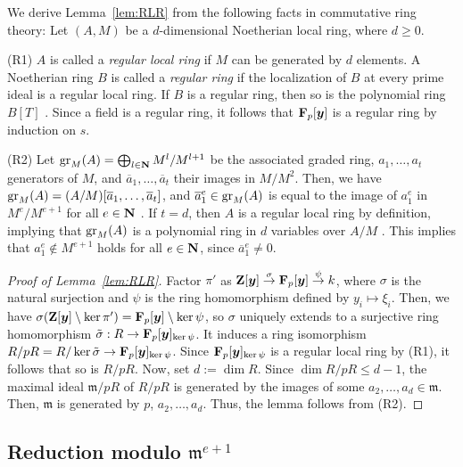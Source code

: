 \documentclass{amsart}
\theoremstyle{plain}
\theoremstyle{definition}
\newcommand{\fm }{{\mathfrak{m}}}
\newcommand{\gr }{\mathop{\rm gr}\nolimits}
\newcommand{\sm}{\setminus}
\newcommand{\nd}{\noindent}
\newcommand{\ol}{\overline}
\newcommand{\F}{{\bf F}}
\newcommand{\Z}{{\bf Z}}
\newcommand{\N}{{\bf N}}
\newcommand{\y}{{\boldsymbol y}}
\begin{document}
We derive Lemma~\ref{lem:RLR} from 
the following facts in commutative ring theory: 
Let $(A,M)$ be a $d$-dimensional Noetherian local ring, 
where $d\ge 0$. 



\nd (R1) 
$A$ is called a {\it regular local ring} 
if $M$ can be generated by $d$ elements. 
A Noetherian ring $B$ is called a {\it regular ring} 
if the localization of $B$ at every prime ideal is a regular local ring. 
If $B$ is a regular ring, 
then so is the polynomial ring $B[T]$ 
\cite[Theorem 19.5]{Matsumura}. 
Since 
a field is a regular ring, 
it follows that $\F _p[\y ]$ is a regular ring by induction on $s$. 


\nd (R2) 
Let $\gr _M(A)=\bigoplus _{l\in \N }M^l/M^{l+1}$ be 
the associated graded ring, 
$a_1,\ldots ,a_t$ generators of $M$, 
and $\ol{a}_1,\ldots ,\ol{a}_t$ their images in $M/M^2$. 
Then, we have $\gr _M(A)=(A/M)[\ol{a}_1,\ldots ,\ol{a}_t]$, 
and $\ol{a}_1^e\in \gr _M(A)$ is equal to 
the image of $a_1^e$ in $M^e/M^{e+1}$ for all $e\in \N $ 
\cite[\S~13]{Matsumura}. 
If $t=d$, 
then $A$ is a regular local ring by definition, 
implying that $\gr _M(A)$ is a polynomial ring in $d$ variables over $A/M$ 
\cite[Theorem~14.4]{Matsumura}. 
This implies that 
$a_1^e\not\in M^{e+1}$ holds for all $e\in \N $, 
since $\ol{a}_1^e\ne 0$. 



\begin{proof}[Proof of Lemma~{\rm \ref{lem:RLR}}]
Factor $\pi '$ as 
$\Z [\y ]\stackrel{\sigma }{\to }
\F _p[\y ]\stackrel{\psi }{\to }k$, 
where $\sigma $ is the natural surjection 
and $\psi $ is the ring homomorphism defined by $y_i\mapsto \xi _i$. 
Then, 
we have $\sigma (\Z [\y ]\sm \ker \pi ')=\F _p[\y ]\sm \ker \psi $, 
so $\sigma $ uniquely extends to a surjective ring homomorphism 
$\tilde{\sigma }:R\to \F _p[\y ]_{\ker \psi }$. 
It induces a ring isomorphism 
$R/pR=R/\ker \tilde{\sigma }\to \F _p[\y ]_{\ker \psi }$. 
Since $\F _p[\y ]_{\ker \psi }$ 
is a regular local ring by (R1), 
it follows that so is $R/pR$. 
Now, set $d:=\dim R$. 
Since $\dim R/pR\le d-1$, 
the maximal ideal $\fm /pR$ of $R/pR$ 
is generated by the images of some 
$a_2,\ldots ,a_d\in \fm $. 
Then, 
$\fm $ is generated by $p$, $a_2,\ldots ,a_d$. 
Thus, the lemma follows from (R2). 
\end{proof}




\subsection{Reduction modulo $\fm ^{e+1}$}\label{sect:Reduce}
\end{document}
